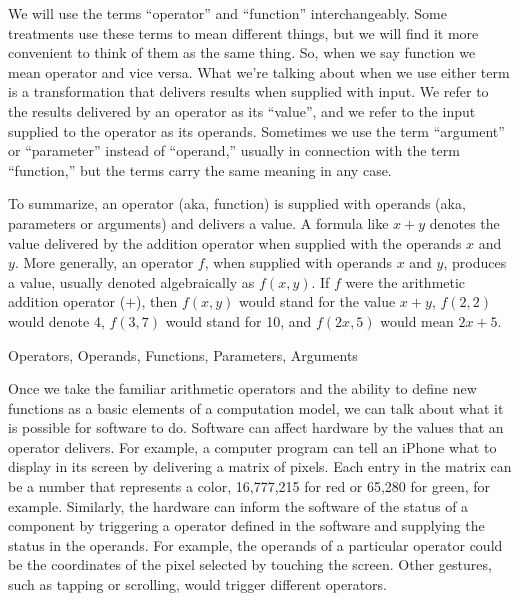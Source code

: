 \begin{aside}
We will use the terms ``operator'' and ``function'' interchangeably.
Some treatments use these terms to mean different things,
but we will find it more convenient to think of them as the same thing.
So, when we say function we mean operator and vice versa.
What we're talking about when we use either term
is a transformation that delivers results when supplied with input.
We refer to the results delivered by an operator as its ``value'',
and we refer to the input supplied to the operator as its operands.
Sometimes we use the term ``argument'' or ``parameter'' instead of ``operand,''
usually in connection with the term ``function,''
but the terms carry the same meaning in any case.

To summarize, an operator (aka, function) is supplied with operands
(aka, parameters or arguments) and delivers a value.
A formula like $x + y$ denotes the value delivered
by the addition operator when supplied with the operands $x$ and $y$.
More generally, an operator $f$, when supplied with operands $x$ and $y$,
produces a value, usually denoted algebraically as $f(x,y)$.
If $f$ were the arithmetic addition operator ($+$),
then $f(x,y)$ would stand for the value $x+y$, $f(2,2)$ would denote 4,
$f(3,7)$ would stand for 10, and $f(2x,5)$ would mean $2x+5$.

\caption{Operators, Operands, Functions, Parameters, Arguments}
\label{operations-and-functions}
\end{aside}

Once we take the familiar arithmetic operators
and the ability to define new functions
as a basic elements of a computation model, 
we can talk about what it is possible for software to do.
Software can affect
hardware by the values that an operator delivers.  For example,
a computer program can tell an iPhone what to display
in its screen by delivering a matrix of pixels.
Each entry in the matrix
can be a number that represents a color, 16,777,215 for
red or 65,280 for green, for example.
Similarly, the hardware can inform the
software of the status of a component by triggering a operator
defined in the software and supplying the status in the operands.
For example, the operands of a particular operator could be
the coordinates of the pixel selected by touching the screen.
Other gestures, such as tapping or
scrolling, would trigger different operators.

